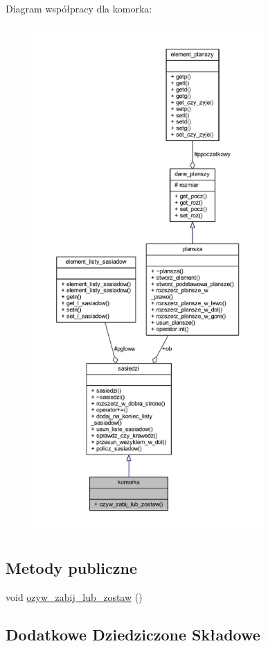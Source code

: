 Diagram współpracy dla komorka\+:
\nopagebreak
\begin{figure}[H]
\begin{center}
\leavevmode
\includegraphics[height=550pt]{classkomorka__coll__graph}
\end{center}
\end{figure}
\subsection*{Metody publiczne}
\begin{DoxyCompactItemize}
\item 
void \mbox{\hyperlink{classkomorka_adce4e335e2839bbb388cfb9f43ddd51e}{ozyw\+\_\+zabij\+\_\+lub\+\_\+zostaw}} ()
\end{DoxyCompactItemize}
\subsection*{Dodatkowe Dziedziczone Składowe}



